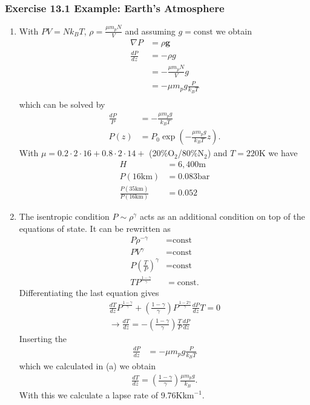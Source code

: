 \documentclass[10pt,a4paper]{book}
\theoremstyle{definition}
\begin{document}
\subsubsection{Exercise 13.1 Example: Earth's Atmosphere}
\begin{enumerate}[label=(\alph*)]
\item With $PV=Nk_BT$, $\rho=\frac{\mu m_p N}{V}$ and assuming $g=\text{const}$ we obtain
\begin{align}
    \nabla P&=\rho \mathbf{g}\\
    \frac{dP}{dz} &=-\rho g\\
    &=-\frac{\mu m_p N}{V} g\\
    &=-\mu m_p g\frac{P}{k_BT}\\
\end{align}
which can be solved by
\begin{align}
    \frac{dP}{P}&=-\frac{\mu m_p g}{k_BT}\\
    P(z)&=P_0\exp\left(-\frac{\mu m_p g}{k_B T}z\right).
\end{align}
With $\mu=0.2\cdot2\cdot16+0.8\cdot2\cdot14+$ (20\%O$_2$/80\%N$_2$) and $T=220$K we have
\begin{align}
    H&=6,400\text{m}\\
    P(16\text{km})&=0.083\text{bar}\\
    \frac{P(35\text{km})}{P(16\text{km})}&=0.052
\end{align}
\item The isentropic condition $P\sim\rho^\gamma$ acts as an additional condition on top of the equations of state. It can be rewritten as
\begin{align}
    P\rho^{-\gamma}&=\text{const}\\
    PV^{\gamma}&=\text{const}\\
    P\left(\frac{T}{P}\right)^{\gamma}&=\text{const}\\
    TP^\frac{1-\gamma}{\gamma}&=\text{const}.
\end{align}
Differentiating the last equation gives
\begin{align}
    \frac{dT}{dz}P^\frac{1-\gamma}{\gamma}+\left(\frac{1-\gamma}{\gamma}\right)P^{\frac{1-2\gamma}{\gamma}}\frac{dP}{dz}T=0\\
    \rightarrow\frac{dT}{dz}=-\left(\frac{1-\gamma}{\gamma}\right)\frac{T}{P}\frac{dP}{dz}
\end{align}
Inserting the
\begin{align}
    \frac{dP}{dz}&=-\mu m_p g\frac{P}{k_BT}
\end{align}
which we calculated in (a) we obtain
\begin{align}
    \frac{dT}{dz}=\left(\frac{1-\gamma}{\gamma}\right)\frac{\mu m_p g}{k_B}.
\end{align}
With this we calculate a lapse rate of 9.76K\;km$^{-1}$.
\end{enumerate}
\end{document}
